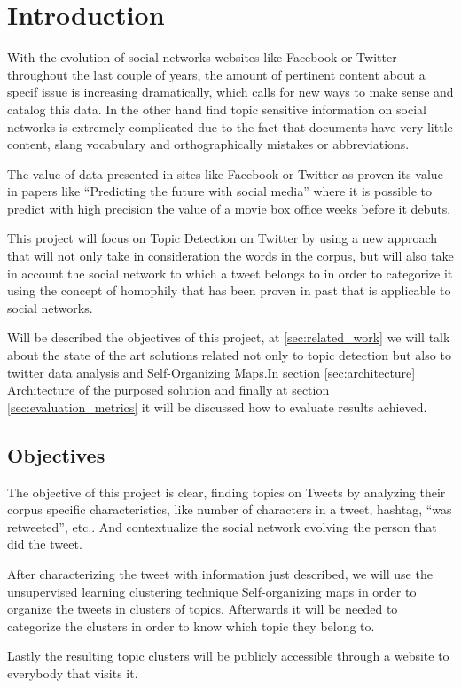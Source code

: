 
\section{Introduction}

With the evolution of social networks websites like Facebook or Twitter throughout the last couple of years, the amount of pertinent content about a specif issue is increasing dramatically, which calls for new ways to make sense and catalog this data.
In the other hand find topic sensitive information on social networks is extremely complicated due to the fact that documents have very little content, slang vocabulary and orthographically mistakes or abbreviations.

The value of data presented in sites like Facebook or Twitter as proven its value in papers like “Predicting the future with social media” where it is possible to predict with high precision the value of a movie box office weeks before it debuts.

This project will focus on Topic Detection on Twitter by using a new approach that will not only take in consideration the words in the corpus, but will also take in account the social network to which a tweet belongs to in order to categorize it using the concept of homophily that has been proven in past that is applicable to social networks.

Will be described the objectives of this project, at \ref{sec:related_work} we will talk about the state of the art solutions related not only to topic detection but also to twitter data analysis and Self-Organizing Maps.In section \ref{sec:architecture} Architecture of the purposed solution and finally at section \ref{sec:evaluation_metrics} it will be discussed how to evaluate results achieved.

\subsection{Objectives} %
\label{sub:objectives}

The objective of this project is clear, finding topics on Tweets by analyzing their corpus specific characteristics, like number of characters in a tweet, hashtag, “was retweeted”, etc.. And contextualize the social network evolving the person that did the tweet.

After characterizing the tweet with information just described, we will use the unsupervised learning clustering technique Self-organizing maps in order to organize the tweets in clusters of topics. Afterwards it will be needed to categorize the clusters in order to know which topic they belong to.

Lastly the resulting topic clusters will be publicly accessible through a website to everybody that visits it.

